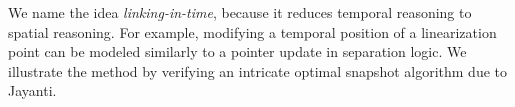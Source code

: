 We name the idea \emph{linking-in-time}, because it reduces temporal
reasoning to spatial reasoning. For example, modifying a temporal
position of a linearization point can be modeled similarly to a
pointer update in separation logic.
%
%
%
%
We illustrate the method by verifying an intricate optimal snapshot
algorithm due to Jayanti.


